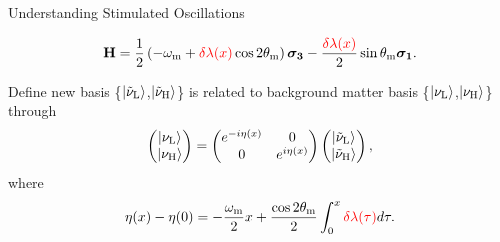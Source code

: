 \documentclass[9pt]{beamer}
\begin{document}
\begin{darkframes}
\begin{frame}{Understanding Stimulated Oscillations}
\begin{tcolorbox}[title=Hamiltonian in Background Matter Basis]
\vspace{-0.5em}
    \begin{equation*}
    \mathbf {H} = \frac{1}{2}\left( - \omega_{\mathrm{m}} + {\color{red}\delta \lambda(x)} \cos 2\theta_{\mathrm{m}} \right) \boldsymbol{\sigma_3} - \frac{  {\color{red}\delta \lambda(x)}  }{2} \sin \theta_{\mathrm{m}} \boldsymbol{\sigma_1}.
\end{equation*}
\end{tcolorbox}


\begin{tcolorbox}[title=A Better Basis]


Define new basis \{$\left| \tilde\nu_{\mathrm{L} }\right\rangle$,$\left| \tilde\nu_{\mathrm{H} }\right\rangle$\} is related to background matter basis \{$\left| \nu_{\mathrm{L} }\right\rangle$,$\left| \nu_{\mathrm{H} }\right\rangle$\} through
\begin{equation*}
    \begin{pmatrix}
    \left| \nu_{\mathrm{L} }\right\rangle \\
    \left| \nu_{\mathrm{H} }\right\rangle
    \end{pmatrix} = \begin{pmatrix}
     e^{-i \eta (x)} & 0 \\  0 & e^{i \eta (x)}
    \end{pmatrix}\begin{pmatrix}
    \left| \tilde\nu_{\mathrm{L} }\right\rangle\\
    \left| \tilde\nu_{\mathrm{H} }\right\rangle
    \end{pmatrix},
\end{equation*}
where
\begin{equation*}
    \eta(x) - \eta(0) = - \frac{\omega_{\mathrm{m}}}{2} x + \frac{\cos 2\theta_{\mathrm{m}}}{2} \int_0^x {\color{red}\delta\lambda (\tau)} d\tau.
\end{equation*}

\end{tcolorbox}



\end{frame}










\end{darkframes}
\end{document}
